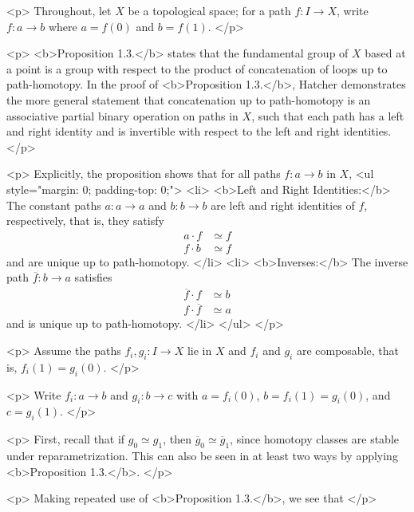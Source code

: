 <p>
    Throughout, let $X$ be a topological space; for a path $f : I \to X$, write $f : a \to b$ where $a = f(0)$ and $b = f(1)$.
</p>

<p>
    <b>Proposition 1.3.</b> states that the fundamental group of $X$ based at a point is a group with respect to the product of concatenation of loops up to path-homotopy. In the proof of <b>Proposition 1.3.</b>, Hatcher demonstrates the more general statement that concatenation up to path-homotopy is an associative partial binary operation on paths in $X$, such that each path has a left and right identity and is invertible with respect to the left and right identities.
</p>

<p>
    Explicitly, the proposition shows that for all paths $f : a \to b$ in $X$,
    <ul style="margin: 0; padding-top: 0;">
        <li>
            <b>Left and Right Identities:</b> The constant paths $a : a \to a$ and $b : b \to b$ are left and right identities of $f$, respectively, that is, they satisfy $$\begin{align*}a \cdot f &\simeq f \tag{left identity}\\ f \cdot b &\simeq f\tag{right identity}\end{align*}$$ and are unique up to path-homotopy.
        </li>
        <li>
            <b>Inverses:</b> The inverse path $\overline{f} : b \to a$ satisfies 
            $$\begin{align*}\overline{f} \cdot f &\simeq b \tag{left inverse}\\ f \cdot \overline{f} &\simeq a \tag{right inverse}\end{align*}$$ and is unique up to path-homotopy.
        </li>
    </ul>
</p>

<p>
    Assume the paths $f_i,g_i : I \to X$ lie in $X$ and $f_i$ and $g_i$ are
    composable, that is, $f_i(1) = g_i(0)$. 
</p>

<p>
    Write $f_i : a \to b$ and $g_i : b \to c$ with $a = f_i(0)$, $b = f_i(1) =
    g_i(0)$, and $c = g_i(1)$.
</p>

<p>
    First, recall that if $g_0 \simeq g_1$, then $\overline g_0 \simeq \overline g_1$, since homotopy classes are stable under reparametrization. This can also be seen in at least two ways by applying <b>Proposition 1.3.</b>. 
</p>

<p>
    Making repeated use of <b>Proposition 1.3.</b>, we see that
</p>

